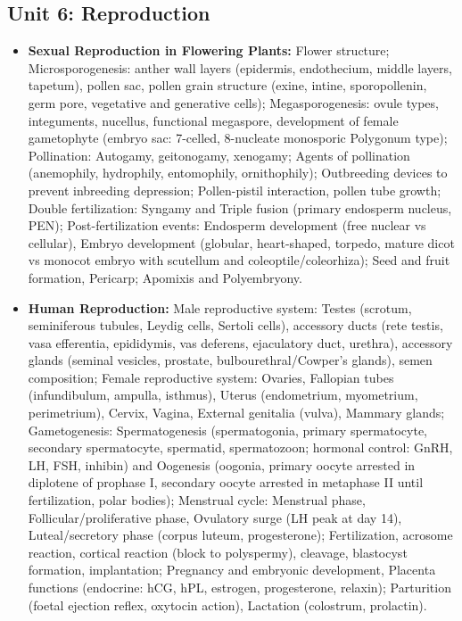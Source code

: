 \documentclass[11pt,a4paper]{article}
\begin{document}
\subsection{Unit 6: Reproduction}
\begin{itemize}
  \item \textbf{Sexual Reproduction in Flowering Plants:} Flower structure; Microsporogenesis: anther wall layers (epidermis, endothecium, middle layers, tapetum), pollen sac, pollen grain structure (exine, intine, sporopollenin, germ pore, vegetative and generative cells); Megasporogenesis: ovule types, integuments, nucellus, functional megaspore, development of female gametophyte (embryo sac: 7-celled, 8-nucleate monosporic Polygonum type); Pollination: Autogamy, geitonogamy, xenogamy; Agents of pollination (anemophily, hydrophily, entomophily, ornithophily); Outbreeding devices to prevent inbreeding depression; Pollen-pistil interaction, pollen tube growth; Double fertilization: Syngamy and Triple fusion (primary endosperm nucleus, PEN); Post-fertilization events: Endosperm development (free nuclear vs cellular), Embryo development (globular, heart-shaped, torpedo, mature dicot vs monocot embryo with scutellum and coleoptile/coleorhiza); Seed and fruit formation, Pericarp; Apomixis and Polyembryony.
  \item \textbf{Human Reproduction:} Male reproductive system: Testes (scrotum, seminiferous tubules, Leydig cells, Sertoli cells), accessory ducts (rete testis, vasa efferentia, epididymis, vas deferens, ejaculatory duct, urethra), accessory glands (seminal vesicles, prostate, bulbourethral/Cowper's glands), semen composition; Female reproductive system: Ovaries, Fallopian tubes (infundibulum, ampulla, isthmus), Uterus (endometrium, myometrium, perimetrium), Cervix, Vagina, External genitalia (vulva), Mammary glands; Gametogenesis: Spermatogenesis (spermatogonia, primary spermatocyte, secondary spermatocyte, spermatid, spermatozoon; hormonal control: GnRH, LH, FSH, inhibin) and Oogenesis (oogonia, primary oocyte arrested in diplotene of prophase I, secondary oocyte arrested in metaphase II until fertilization, polar bodies); Menstrual cycle: Menstrual phase, Follicular/proliferative phase, Ovulatory surge (LH peak at day 14), Luteal/secretory phase (corpus luteum, progesterone); Fertilization, acrosome reaction, cortical reaction (block to polyspermy), cleavage, blastocyst formation, implantation; Pregnancy and embryonic development, Placenta functions (endocrine: hCG, hPL, estrogen, progesterone, relaxin); Parturition (foetal ejection reflex, oxytocin action), Lactation (colostrum, prolactin).

\end{itemize}
\end{document}
